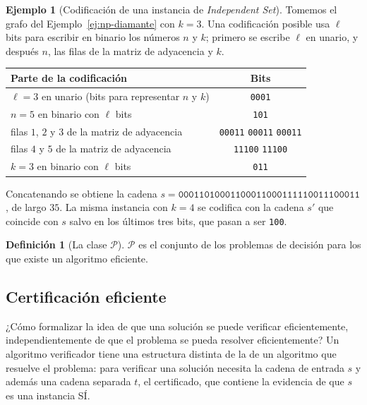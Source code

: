 \documentclass[12pt, spanish, oneside, openany]{book}
\newcommand{\clP}{\mathcal{P}}
\newcommand{\prob}[1]{\textit{#1}}
\newcommand{\IS}{\prob{Independent Set}\xspace}
\theoremstyle{uprightplain}
\theoremstyle{definition}
\newtheorem{definicion}[teorema]{Definición}
\newtheorem{ejemplo}[teorema]{Ejemplo}
\theoremstyle{remark}
\theoremstyle{definition}
\begin{document}
\begin{ejemplo}[Codificación de una instancia de \IS]
\label{ej:np-codificacion}
Tomemos el grafo del Ejemplo~\ref{ej:np-diamante} con $k=3$. Una codificación posible usa $\ell$ bits para escribir en binario los números $n$ y $k$; primero se escribe $\ell$ en unario, y después $n$, las filas de la matriz de adyacencia y $k$.
\begin{center}
\small
\renewcommand{\arraystretch}{1.15}
\begin{tabular}{@{}lc@{}}
\toprule
\textbf{Parte de la codificación} & \textbf{Bits}\\
\midrule
$\ell=3$ en unario (bits para representar $n$ y $k$) & \texttt{0001}\\
$n=5$ en binario con $\ell$ bits & \texttt{101}\\
filas $1$, $2$ y $3$ de la matriz de adyacencia & \texttt{00011} \texttt{00011} \texttt{00011}\\
filas $4$ y $5$ de la matriz de adyacencia & \texttt{11100} \texttt{11100}\\
$k=3$ en binario con $\ell$ bits & \texttt{011}\\
\bottomrule
\end{tabular}
\end{center}
Concatenando se obtiene la cadena $s=\texttt{00011010001100011000111110011100011}$, de largo $35$. La misma instancia con $k=4$ se codifica con la cadena $s'$ que coincide con $s$ salvo en los últimos tres bits, que pasan a ser \texttt{100}.
\end{ejemplo}

\begin{definicion}[La clase $\clP$]
\label{def:np-clase-p}
$\clP$ es el conjunto de los problemas de decisión para los que existe un algoritmo eficiente.
\end{definicion}

\subsection{Certificación eficiente}

¿Cómo formalizar la idea de que una solución se puede verificar eficientemente, independientemente de que el problema se pueda resolver eficientemente? Un algoritmo verificador tiene una estructura distinta de la de un algoritmo que resuelve el problema: para verificar una solución necesita la cadena de entrada $s$ y además una cadena separada $t$, el certificado, que contiene la evidencia de que $s$ es una instancia SÍ.
\end{document}
